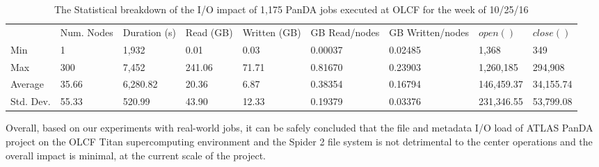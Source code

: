 \begin{table}[t]
\centering
\begin{tabular}{lllllllll}
 & Num. Nodes & Duration (s) & Read (GB) & Written (GB) & GB Read/nodes & GB Written/nodes & $open()$ & $close()$ \\
Min & 1 & 1,932 & 0.01 & 0.03 & 0.00037 & 0.02485 & 1,368 & 349 \\
Max & 300 & 7,452 & 241.06 & 71.71 & 0.81670 & 0.23903 & 1,260,185 & 294,908 \\
Average & 35.66 & 6,280.82 & 20.36 & 6.87 & 0.38354 & 0.16794 & 146,459.37 & 34,155.74 \\
Std. Dev. & 55.33 & 520.99 & 43.90 & 12.33 & 0.19379 & 0.03376 & 231,346.55 & 53,799.08
\end{tabular}
\caption{The Statistical breakdown of the I/O impact of 1,175 PanDA jobs executed at OLCF for the week of 10/25/16}
\label{panda-olcf-stats}
\end{table}

Overall, based on our experiments with real-world jobs, it can be safely
concluded that the file and metadata I/O load of ATLAS PanDA project on the
OLCF Titan supercomputing environment and the Spider 2 file system is not
detrimental to the center operations and the overall impact is minimal, at the
current scale of the project.

